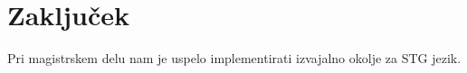 %

\chapter{Zaključek}
\label{ch:zakljucek}

Pri magistrskem delu nam je uspelo implementirati izvajalno okolje za STG jezik.